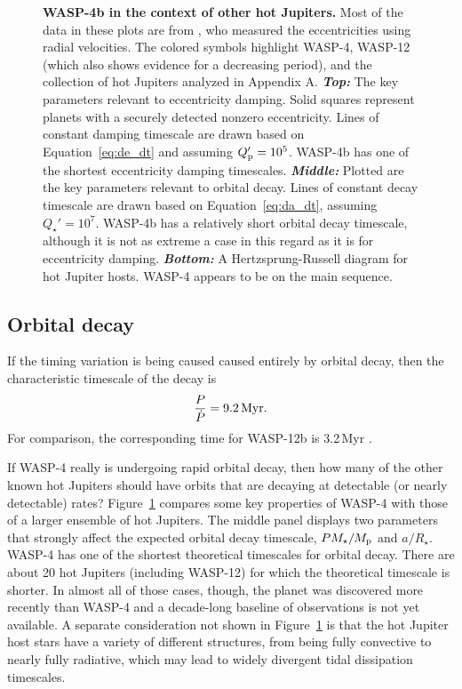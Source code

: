 \documentclass[12pt,twocolumn,tighten]{aastex62}
\begin{document}
\begin{figure}[t]
  \vspace{-0.6cm}
  \caption{
    {\bf WASP-4b in the context of other hot Jupiters.}
    Most of the data in these plots are from \citet{bonomo_gaps_2017},
    who measured the eccentricities using radial velocities.  The
    colored symbols highlight WASP-4, WASP-12 (which also shows
    evidence for a decreasing period), and the collection of hot
    Jupiters analyzed in Appendix A.
    {\bf \it Top:}
    The key parameters relevant to eccentricity damping.  Solid
    squares represent planets with a securely detected nonzero
    eccentricity. Lines of constant damping timescale are drawn based
    on Equation~\ref{eq:de_dt} and assuming $Q_{\rm p}' = 10^5$.
    WASP-4b has one of the shortest eccentricity damping timescales.
    {\bf \it Middle:} 
    Plotted are the key parameters relevant to orbital decay.  Lines
    of constant decay timescale are drawn based on
    Equation~\ref{eq:da_dt}, assuming $Q_\star' = 10^7$.  WASP-4b has
    a relatively short orbital decay timescale, although it is not as
    extreme a case in this regard as it is for eccentricity damping.
    {\bf \it Bottom:}
    A Hertzsprung-Russell diagram for hot Jupiter hosts. WASP-4
    appears to be on the main sequence.
    \label{fig:context}
  }
\end{figure}

\subsection{Orbital decay}

If the timing variation is being caused caused entirely by orbital
decay, then the characteristic timescale of the decay is
\begin{equation}
  \frac{P}{ \dot{P} } = 9.2 \, {\rm Myr}.
\end{equation}
For comparison, the corresponding time for WASP-12b is 3.2\,Myr
\citep{patra_2017}.

If WASP-4 really is undergoing rapid orbital decay, then how many of
the other known hot Jupiters should have orbits that are decaying at
detectable (or nearly detectable) rates?  Figure~\ref{fig:context}
compares some key properties of WASP-4 with those of a larger ensemble
of hot Jupiters.  The middle panel displays two parameters that
strongly affect the expected orbital decay timescale, $P
M_\star/M_{\rm p}$ and $a/R_\star$.  WASP-4 has one of the shortest
theoretical timescales for orbital decay.  There are about 20 hot
Jupiters (including WASP-12) for which the theoretical timescale is
shorter.  In almost all of those cases, though, the planet was
discovered more recently than WASP-4 and a decade-long baseline of
observations is not yet available.  A separate consideration not shown
in Figure~\ref{fig:context} is that the hot Jupiter host stars have a
variety of different structures, from being fully convective to nearly
fully radiative, which may lead to widely divergent tidal dissipation
timescales.
\end{document}
